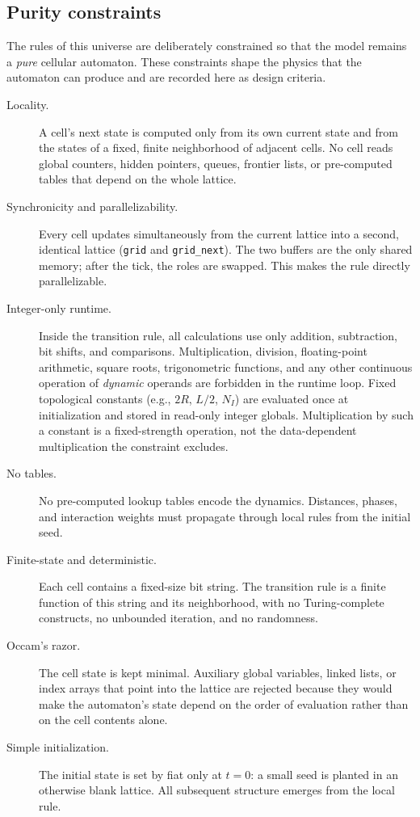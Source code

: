 \documentclass[a4paper]{article}
\begin{document}
\subsection{Purity constraints}
\label{subsec:purity}

The rules of this universe are deliberately constrained so that the model remains a \emph{pure} cellular automaton. These constraints shape the physics that the automaton can produce and are recorded here as design criteria.

\begin{description}
\item[Locality.] A cell's next state is computed only from its own current state and from the states of a fixed, finite neighborhood of adjacent cells. No cell reads global counters, hidden pointers, queues, frontier lists, or pre-computed tables that depend on the whole lattice.
\item[Synchronicity and parallelizability.] Every cell updates simultaneously from the current lattice into a second, identical lattice (\texttt{grid} and \texttt{grid\_next}). The two buffers are the only shared memory; after the tick, the roles are swapped. This makes the rule directly parallelizable.
\item[Integer-only runtime.] Inside the transition rule, all calculations use only addition, subtraction, bit shifts, and comparisons. Multiplication, division, floating-point arithmetic, square roots, trigonometric functions, and any other continuous operation of \emph{dynamic} operands are forbidden in the runtime loop. Fixed topological constants (e.g., $2R$, $L/2$, $N_I$) are evaluated once at initialization and stored in read-only integer globals. Multiplication by such a constant is a fixed-strength operation, not the data-dependent multiplication the constraint excludes.
\item[No tables.] No pre-computed lookup tables encode the dynamics. Distances, phases, and interaction weights must propagate through local rules from the initial seed.
\item[Finite-state and deterministic.] Each cell contains a fixed-size bit string. The transition rule is a finite function of this string and its neighborhood, with no Turing-complete constructs, no unbounded iteration, and no randomness.
\item[Occam's razor.] The cell state is kept minimal. Auxiliary global variables, linked lists, or index arrays that point into the lattice are rejected because they would make the automaton's state depend on the order of evaluation rather than on the cell contents alone.
\item[Simple initialization.] The initial state is set by fiat only at $t=0$: a small seed is planted in an otherwise blank lattice. All subsequent structure emerges from the local rule.
\end{description}
\end{document}
